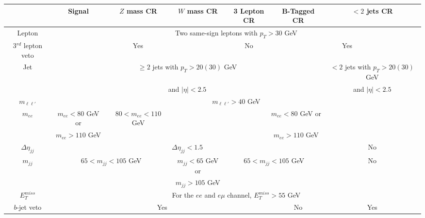 \begin{tabular}{c|cccccc} 
\hline 
\hline 
        & \multicolumn{1}{c|}{Signal} & \multicolumn{1}{c|}{$Z$ mass CR} & \multicolumn{1}{c|}{$W$ mass CR} & \multicolumn{1}{c|}{3 Lepton CR} &  \multicolumn{1}{c|}{B-Tagged CR} & \multicolumn{1}{c}{$<2$ jets CR} \\ \hline 
Lepton & \multicolumn{6}{c}{Two same-sign leptons with $p_T>30$ GeV} \\  \hline
3$^{rd}$ lepton veto & \multicolumn{3}{c|}{Yes} & \multicolumn{1}{c|}{No} & \multicolumn{2}{c}{Yes} \\  \hline
Jet & \multicolumn{5}{c|}{$\ge 2$ jets with $p_T>20 (30)$ GeV} & $<2$ jets with $p_T>20 (30)$ GeV \\  
      & \multicolumn{5}{c|}{ and $|\eta|<2.5$} &  and $|\eta|<2.5$ \\  \hline
$m_{\ell \ell'}$  & \multicolumn{6}{c}{$m_{\ell\ell'}>40$ GeV} \\  \hline
$m_{ee}$    & \multicolumn{1}{c|}{$m_{ee}<80$ GeV or}   & \multicolumn{1}{c|}{\multirow{2}{*}{$80<m_{ee}<110$ GeV}} & \multicolumn{4}{c}{$m_{ee}<80$ GeV or} \\  
                   & \multicolumn{1}{c|}{$m_{ee}>110$ GeV}      & \multicolumn{1}{c|}{} & \multicolumn{4}{c}{$m_{ee}>110$ GeV} \\  \hline
$\Delta \eta_{jj}$     & \multicolumn{5}{c|}{$\Delta \eta_{jj}<1.5$} & No \\ \hline 
$m_{jj}$          & \multicolumn{2}{c|}{\multirow{2}{*}{$65<m_{jj}<105$ GeV}} &  \multicolumn{1}{c|}{$m_{jj}<65$ GeV or} &  \multicolumn{2}{c|}{\multirow{2}{*}{$65<m_{jj}<105$ GeV}} &  \multicolumn{1}{c}{\multirow{2}{*}{No}}  \\ 
                       & \multicolumn{2}{c|}{} &  \multicolumn{1}{c|}{$m_{jj}>105$ GeV} &  \multicolumn{2}{c|}{} & \multicolumn{1}{c}{} \\ \hline
$E_T^{miss}$ & \multicolumn{6}{c}{For the $ee$ and $e\mu$ channel, $E_T^{miss}>55$ GeV} \\   \hline
$b$-jet veto & \multicolumn{4}{c|}{Yes} & \multicolumn{1}{c|}{No} & Yes \\  \hline
\hline 
\end{tabular}

